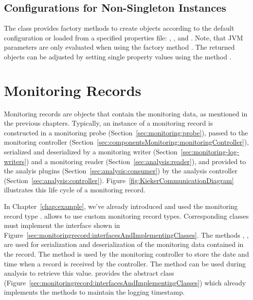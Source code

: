 \subsection*{Configurations for Non-Singleton Instances}

The class  provides factory methods to create %
 objects according to the default configuration %
or loaded from a specified properties file: , %
, and . %
Note, that JVM parameters are only evaluated when using the factory method %
. %
The returned  objects can be adjusted by setting %
single property values using the method . %

\section{Monitoring Records}\label{sec:componentsMonitoring:monitoringRecords}

Monitoring records are objects that contain the monitoring data, as mentioned %
in the previous chapters. Typically, an instance of a monitoring record is %
constructed in a monitoring probe (Section~\ref{sec:monitoring:probe}), %
passed to the monitoring controller (Section~\ref{sec:componentsMonitoring:monitoringController}), %
serialized and deserialized by a monitoring %
writer (Section~\ref{sec:monitoring-log-writers}) and a
monitoring reader (Section~\ref{sec:analysis:reader}), and provided to the %
analyis plugins (Section~\ref{sec:analysis:consumer}) %
by the analysis controller (Section~\ref{sec:analysis:controller}). %
Figure~\ref{fig:KiekerCommunicationDiagram} illustrates this life cycle of a monitoring %
record. %

In Chapter~\ref{chap:example}, we've already introduced and used the monitoring %
record type . \Kieker{} allows to use custom %
monitoring record types. Corresponding classes must implement the %
interface  shown in Figure~\ref{sec:monitoringrecord:interfacesAndImplementingClasses}. %
The methods , ,  %
are used for serialization and deserialization of the monitoring data contained %
in the record. The method  is used by the monitoring controller to %
store the date and time when a record is received by the controller. %
The method  can be used during analysis to retrieve %
this value. \KiekerMonitoringPart{} provides the abstract class %
 (Figure~\ref{sec:monitoringrecord:interfacesAndImplementingClasses}) %
which already implements the methods to maintain the logging timestamp. 

